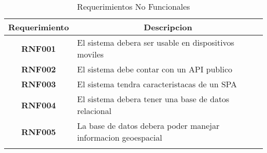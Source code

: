     \begin{longtable}{ c  X }
      \toprule
        \textbf{Requerimiento} &
        \multicolumn{1}{c}{\textbf{Descripcion}}\\

      \midrule
      \endhead

\addlinespace
\textbf{RNF001}
&
El sistema debera ser usable en dispositivos moviles
\\

\addlinespace
\textbf{RNF002}
&
El sistema debe contar con un API publico
\\

\addlinespace
\textbf{RNF003}
&
El sistema tendra caracteristacas de un SPA
\\

\addlinespace
\textbf{RNF004}
&
El sistema debera tener una base de datos relacional
\\

\addlinespace
\textbf{RNF005}
&
La base de datos debera poder manejar informacion geoespacial
\\




      \bottomrule
      \caption{Requerimientos No Funcionales}
      \label{tab:requerimientos no funcionales}
    \end{longtable}
